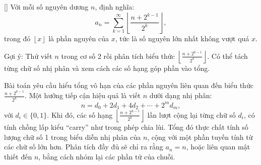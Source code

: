 \documentclass[../03-arithmetic-functions.tex]{subfiles}
\begin{document}
\begin{exercise*}\label{example:GBR-2015-TST2-Q2-P3}[\textbf{}]
    Với mỗi số nguyên dương \( n \), định nghĩa:
    \[
        a_n = \sum_{k=1}^{\infty} \left\lfloor \frac{n + 2^{k-1}}{2^k} \right\rfloor,
    \]
    trong đó \( \left\lfloor x \right\rfloor \) là phần nguyên của \( x \), tức là số nguyên lớn nhất không vượt quá \( x \).
\end{exercise*}

\begin{remark*}
    Gợi ý: Thử viết \( n \) trong cơ số 2 rồi phân tích biểu thức \( \left\lfloor \tfrac{n + 2^{k-1}}{2^k} \right\rfloor \).  
    Có thể tách từng chữ số nhị phân và xem cách các số hạng góp phần vào tổng.
\end{remark*}

\begin{story*}
    Bài toán yêu cầu hiểu tổng vô hạn của các phần nguyên liên quan đến biểu thức \( \frac{n + 2^{k-1}}{2^k} \).  
    Một hướng tiếp cận hiệu quả là viết \( n \) dưới dạng nhị phân:
    \[
        n = d_0 + 2d_1 + 4d_2 + \cdots + 2^m d_m,
    \]
    với \( d_i \in \{0, 1\} \). Khi đó, các số hạng \( \left\lfloor \frac{n + 2^{k-1}}{2^k} \right\rfloor \) lần lượt cộng lại từng chữ số \( d_i \), có tính chồng lấp kiểu “carry” như trong phép chia lùi. Tổng đó thực chất tính số lượng chữ số 1 trong biểu diễn nhị phân của \( n \), cộng với một phần tuyến tính từ các chữ số lớn hơn.  
    Phân tích đầy đủ sẽ chỉ ra rằng \( a_n = n \), hoặc liên quan mật thiết đến \( n \), bằng cách nhóm lại các phần tử của chuỗi.
\end{story*}
\end{document}
